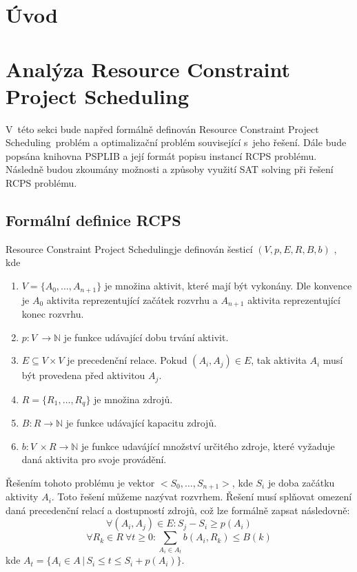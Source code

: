 \documentclass[a4paper, 12pt]{article}
\title{\rcps}
\author{Martin Hruška\\xhrusk16@stud.fit.vutbr.cz}
\date{}
\newcommand{\rcps}[0]{Resource Constraint Project Scheduling}
\begin{document}
\maketitle

\section{Úvod}
\label{sec:intro}

\section{Analýza \rcps}
V~této sekci bude napřed formálně definován \rcps\ problém a optimalizační problém související s~jeho řešení.
Dále bude popsána knihovna PSPLIB a její formát popisu instancí RCPS problému.
Následně budou zkoumány možnosti a způsoby využití SAT solving při řešení RCPS problému.

\subsection{Formální definice RCPS}
\rcps je definován šesticí $(V, p, E, R, B, b)$ \cite{artigues:2007}, kde
\begin{enumerate}
    \item $V=\{A_0, \ldots, A_{n+1}\}$ je množina aktivit, které mají být vykonány.
    Dle konvence je $A_0$ aktivita reprezentující začátek rozvrhu a $A_{n+1}$ aktivita reprezentující konec rozvrhu.
    \item $p: V~\rightarrow \mathbb{N}$ je funkce udávající dobu trvání aktivit.
    \item $E \subseteq V\times V$ je precedenční relace.
    Pokud $(A_i, A_j) \in E$, tak aktivita $A_i$ musí být provedena před aktivitou $A_j$.
    \item $R=\{R_1,\ldots,R_q\}$ je množina zdrojů.
    \item $B: R \rightarrow \mathbb{N}$ je funkce udávající kapacitu zdrojů.
    \item $b: V~\times R \rightarrow \mathbb{N}$ je funkce udavájící množství určitého zdroje, které vyžaduje daná aktivita pro
    svoje provádění.
\end{enumerate}

Řešením tohoto problému je vektor $<S_0,\ldots,S_{n+1}>$, kde $S_i$ je doba začátku aktivity $A_i$.
Toto řešení můžeme nazývat rozvrhem.
Řešení musí splňovat omezení daná precedenční relací a dostupností zdrojů, což lze formálně zapsat následovně:
\begin{equation}
 \forall (A_i,A_j) \in E: S_j - S_i \geq p(A_i)
\end{equation}
\begin{equation}
 \forall R_k \in R\ \forall t \geq 0: \sum_{A_i \in A_t} b(A_i, R_k) \leq B(k)
\end{equation}
kde $A_t=\{A_i \in A\,|\, S_i \leq t \leq S_i+p(A_i)\}$.
\end{document}
